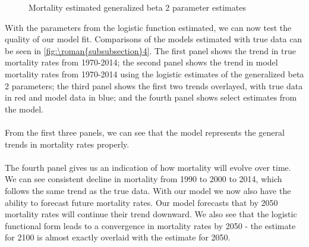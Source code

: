 \documentclass{article}
\renewcommand{\thesubsubsection}{\roman{subsubsection}}
\numberwithin{equation}{subsection}
\newcommand*{\FigureDir}{../../graphs}
\begin{document}
\begin{appendices}
\begin{figure}[H]
   \centering
   \caption{\label{fig:\thesubsubsection3}Mortality estimated generalized beta 2 parameter estimates}
\end{figure}

\noindent
With the parameters from the logistic function estimated, we can now test the quality of our model fit. Comparisons of the models estimated with true data can be seen in \autoref{fig:\thesubsubsection4}. The first panel shows the trend in true mortality rates from 1970-2014; the second panel shows the trend in model mortality rates from 1970-2014 using the logistic estimates of the generalized beta 2 parameters; the third panel shows the first two trends overlayed, with true data in red and model data in blue; and the fourth panel shows select estimates from the model.
\\\\
From the first three panels, we can see that the model represents the general trends in mortality rates properly. 
\\\\
The fourth panel gives us an indication of how mortality will evolve over time. We can see consistent decline in mortality from 1990 to 2000 to 2014, which follows the same trend as the true data. With our model we now also have the ability to forecast future mortality rates. Our model forecasts that by 2050 mortality rates will continue their trend downward. We also see that the logistic functional form leads to a convergence in mortality rates by 2050 - the estimate for 2100 is almost exactly overlaid with the estimate for 2050.


\end{appendices}
\end{document}
